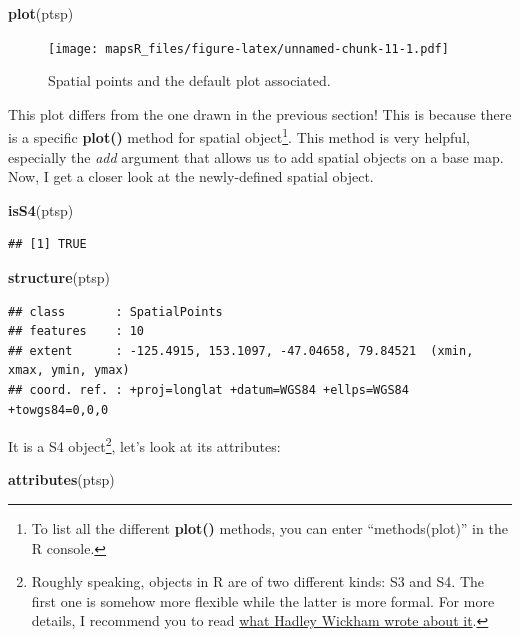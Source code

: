 \documentclass[]{report}
\newenvironment{Shaded}{\begin{snugshade}}{\end{snugshade}}
\newcommand{\KeywordTok}[1]{\textcolor[rgb]{0.13,0.29,0.53}{\textbf{{#1}}}}
\newcommand{\NormalTok}[1]{{#1}}
\let\rmarkdownfootnote\footnote%
\def\footnote{\protect\rmarkdownfootnote}
\begin{document}
\begin{Shaded}
\begin{Highlighting}[]
\KeywordTok{plot}\NormalTok{(ptsp)}
\end{Highlighting}
\end{Shaded}

\begin{figure}[htbp]
\centering
\texttt{[image: mapsR\_files/figure-latex/unnamed-chunk-11-1.pdf]}
\caption{Spatial points and the default plot associated.}
\end{figure}

This plot differs from the one drawn in the previous section! This is
because there is a specific \textbf{plot()} method for spatial
object\footnote{To list all the different \textbf{plot()} methods, you
  can enter ``methods(plot)'' in the R console.}. This method is very
helpful, especially the \emph{add} argument that allows us to add
spatial objects on a base map. Now, I get a closer look at the
newly-defined spatial object.

\begin{Shaded}
\begin{Highlighting}[]
\KeywordTok{isS4}\NormalTok{(ptsp)}
\end{Highlighting}
\end{Shaded}

\begin{verbatim}
## [1] TRUE
\end{verbatim}

\begin{Shaded}
\begin{Highlighting}[]
\KeywordTok{structure}\NormalTok{(ptsp)}
\end{Highlighting}
\end{Shaded}

\begin{verbatim}
## class       : SpatialPoints 
## features    : 10 
## extent      : -125.4915, 153.1097, -47.04658, 79.84521  (xmin, xmax, ymin, ymax)
## coord. ref. : +proj=longlat +datum=WGS84 +ellps=WGS84 +towgs84=0,0,0
\end{verbatim}

It is a S4 object\footnote{Roughly speaking, objects in R are of two
  different kinds: S3 and S4. The first one is somehow more flexible
  while the latter is more formal. For more details, I recommend you to
  read \href{http://adv-r.had.co.nz/OO-essentials.html}{what Hadley
  Wickham wrote about it}.}, let's look at its attributes:

\begin{Shaded}
\begin{Highlighting}[]
\KeywordTok{attributes}\NormalTok{(ptsp)}
\end{Highlighting}
\end{Shaded}
\end{document}
